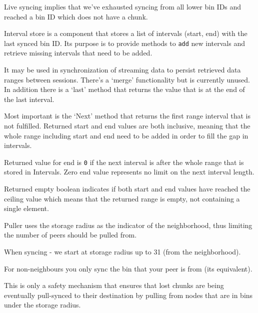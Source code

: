 Live syncing implies that we've exhausted syncing from all lower bin IDs
and reached a bin ID which does not have a chunk.

Interval store is a component that stores a list of intervals (start,
end) with the last synced bin ID. Its purpose is to provide methods to
\texttt{add} new intervals and retrieve missing intervals that need to
be added.

It may be used in synchronization of streaming data to persist retrieved
data ranges between sessions. There's a `merge' functionality but is
currently unused. In addition there is a `last' method that returns the
value that is at the end of the last interval.

Most important is the `Next' method that returns the first range
interval that is not fulfilled. Returned start and end values are both
inclusive, meaning that the whole range including start and end need to
be added in order to fill the gap in intervals.

Returned value for end is \texttt{0} if the next interval is after the
whole range that is stored in Intervals. Zero end value represents no
limit on the next interval length.

Returned empty boolean indicates if both start and end values have
reached the ceiling value which means that the returned range is empty,
not containing a single element.

Puller uses the storage radius as the indicator of the neighborhood,
thus limiting the number of peers should be pulled from.

When syncing - we start at storage radius up to 31 (from the
neighborhood).

For non-neighbours you only sync the bin that your peer is from (its
equivalent).

This is only a safety mechanism that ensures that lost chunks are being
eventually pull-synced to their destination by pulling from nodes that
are in bins under the storage radius.




